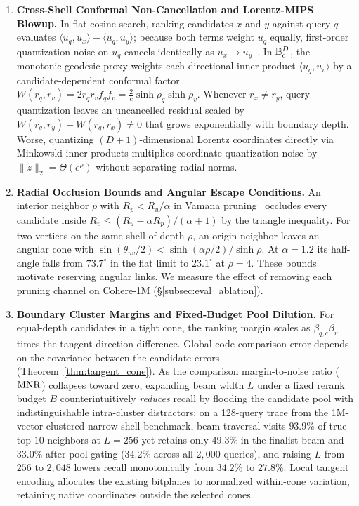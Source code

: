 \begin{enumerate}
  \item \textbf{Cross-Shell Conformal Non-Cancellation and Lorentz-MIPS Blowup.}
  In flat cosine search, ranking candidates $x$ and $y$ against query $q$ evaluates $\langle u_q, u_x\rangle - \langle u_q, u_y\rangle$; because both terms weight $u_q$ equally, first-order quantization noise on $u_q$ cancels identically as $u_x \to u_y$~\cite{xiao2026decisions}.
  In $\mathbb{B}_c^D$, the monotonic geodesic proxy weights each directional inner product $\langle u_q, u_v\rangle$ by a candidate-dependent conformal factor $W(r_q, r_v) = 2 r_q r_v f_q f_v = \frac{2}{c}\sinh\rho_q\sinh\rho_v$.
  Whenever $r_x \ne r_y$, query quantization leaves an uncancelled residual scaled by $W(r_q, r_y) - W(r_q, r_x) \ne 0$ that grows exponentially with boundary depth.
  Worse, quantizing $(D+1)$-dimensional {Lorentz} coordinates directly via Minkowski inner products multiplies coordinate quantization noise by $\|\tilde{z}\|_2 = \Theta(e^\rho)$ without separating radial norms.

  \item \textbf{Radial Occlusion Bounds and Angular Escape Conditions.}
  An interior neighbor $p$ with $R_p<R_u/\alpha$ in {Vamana} pruning~\cite{subramanya2019diskann} occludes every candidate inside $R_v\le(R_u-\alpha R_p)/(\alpha+1)$ by the triangle inequality. For two vertices on the same shell of depth $\rho$, an origin neighbor leaves an angular cone with $\sin(\theta_{uv}/2)<\sinh(\alpha\rho/2)/\sinh\rho$. At $\alpha=1.2$ its half-angle falls from $73.7^\circ$ in the flat limit to $23.1^\circ$ at $\rho=4$.
  These bounds motivate reserving angular links. We measure the effect of removing each pruning channel on {Cohere-1M} (\S\ref{subsec:eval_ablation}).

  \item \textbf{Boundary Cluster Margins and Fixed-Budget Pool Dilution.}
  For equal-depth candidates in a tight cone, the ranking margin scales as $\beta_{q,c}\beta_v$ times the tangent-direction difference. Global-code comparison error depends on the covariance between the candidate errors (Theorem~\ref{thm:tangent_cone}).
  As the comparison margin-to-noise ratio ({$\mathrm{MNR}$}) collapses toward zero, expanding beam width $L$ under a fixed rerank budget $B$ counterintuitively \emph{reduces} recall by flooding the candidate pool with indistinguishable intra-cluster distractors: on a 128-query trace from the 1M-vector clustered narrow-shell benchmark, beam traversal visits $93.9\%$ of true top-$10$ neighbors at $L=256$ yet retains only $49.3\%$ in the finalist beam and $33.0\%$ after pool gating ($34.2\%$ across all $2{,}000$ queries), and raising $L$ from $256$ to $2{,}048$ lowers recall monotonically from $34.2\%$ to $27.8\%$.
  Local tangent encoding allocates the existing bitplanes to normalized within-cone variation, retaining native coordinates outside the selected cones.
\end{enumerate}

